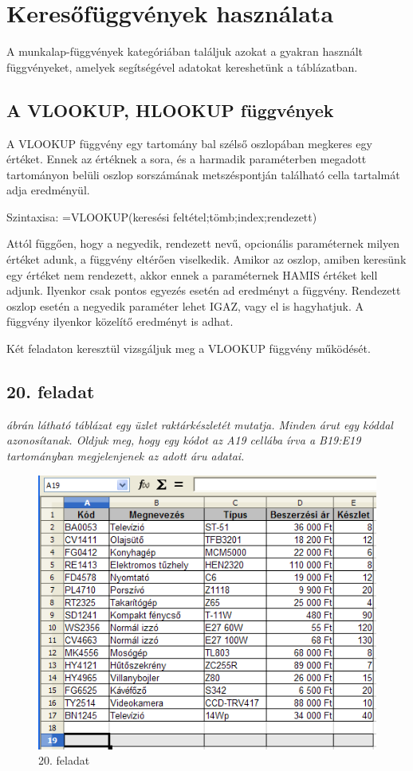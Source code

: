 \chapter{Keresőfüggvények használata}
\thispagestyle{empty}

A munkalap-függvények kategóriában találjuk azokat a gyakran
használt függvényeket, amelyek segítségével adatokat
kereshetünk a táblázatban. 

\section{A VLOOKUP, HLOOKUP függvények}

A VLOOKUP függvény egy tartomány bal szélső oszlopában
megkeres egy értéket. Ennek az értéknek a sora, és a harmadik
paraméterben megadott tartományon belüli oszlop sorszámának
metszéspontján található cella tartalmát adja eredményül.

Szintaxisa: =VLOOKUP(keresési feltétel;tömb;index;rendezett)

Attól függően, hogy a negyedik, rendezett nevű, opcionális
paraméternek milyen értéket adunk, a függvény eltérően
viselkedik. Amikor az oszlop, amiben keresünk egy értéket nem
rendezett, akkor ennek a paraméternek HAMIS értéket kell adjunk.
Ilyenkor csak pontos egyezés esetén ad eredményt a függvény.
Rendezett oszlop esetén a negyedik paraméter lehet IGAZ, vagy el is
hagyhatjuk. A függvény ilyenkor közelítő eredményt is
adhat. 

Két feladaton keresztül vizsgáljuk meg a VLOOKUP függvény
működését.


\section{20. feladat}

{\itshape
{} ábrán látható táblázat egy üzlet
raktárkészletét mutatja. Minden árut egy kóddal
azonosítanak. Oldjuk meg, hogy egy kódot az A19 cellába írva a
B19:E19 tartományban megjelenjenek az adott áru adatai.}

\begin{figure}[!h]
\begin{center}
\includegraphics[width=11.804cm]{oocalcv1-img94.png}
\caption{20. feladat}\label{20-feladat}
\end{center}
\end{figure}


